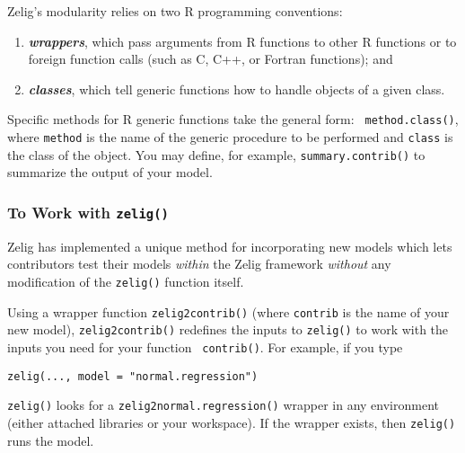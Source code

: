 Zelig's modularity relies on two R programming conventions:
\begin{enumerate}
\item \emph{\bf wrappers}, which pass arguments from R functions to
  other R functions or to foreign function calls (such as C, C++, or
  Fortran functions); and 
\item \emph{\bf classes}, which tell generic functions how to handle
  objects of a given class.  
\end{enumerate}
Specific methods for R generic functions take the general form: {\tt
  method.class()}, where {\tt method} is the name of the generic
procedure to be performed and {\tt class} is the class of the object.
You may define, for example, {\tt summary.contrib()} to summarize the
output of your model.

\subsubsection{To Work with {\tt zelig()}}

Zelig has implemented a unique method for incorporating new models
which lets contributors test their models \emph{within} the Zelig
framework \emph{without} any modification of the {\tt zelig()}
function itself.  

Using a wrapper function {\tt zelig2contrib()} (where {\tt contrib} is
the name of your new model), {\tt zelig2contrib()} redefines the inputs to
{\tt zelig()} to work with the inputs you need for your function {\tt
contrib()}.  For example, if you type
\begin{verbatim}
zelig(..., model = "normal.regression")
\end{verbatim}
{\tt zelig()} looks for a {\tt zelig2normal.regression()} wrapper in any
environment (either attached libraries or your workspace).  If the
wrapper exists, then {\tt zelig()} runs the model.  

